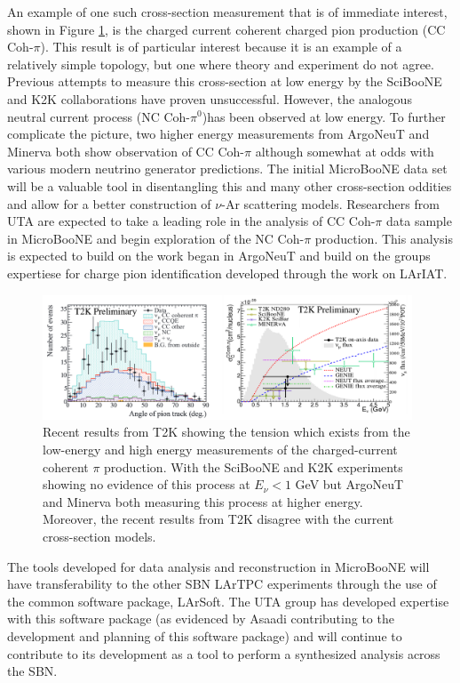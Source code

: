 An example of one such cross-section measurement that is of immediate interest, shown in Figure \ref{fig:cccohpion}, is the charged current coherent charged pion production (CC Coh-$\pi$). This result is of particular interest because it is an example of a relatively simple topology, but one where theory and experiment do not agree. Previous attempts to measure this cross-section at low energy by the SciBooNE and K2K collaborations have proven unsuccessful. However, the analogous neutral current process (NC Coh-$\pi^{0}$)has been observed at low energy. To further complicate the picture, two higher energy measurements from ArgoNeuT and Minerva both show observation of CC Coh-$\pi$ although somewhat at odds with various modern neutrino generator predictions. The initial MicroBooNE data set will be a valuable tool in disentangling this and many other cross-section oddities and allow for a better construction of $\nu$-Ar scattering models. Researchers from UTA are expected to take a leading role in the analysis of CC Coh-$\pi$ data sample in MicroBooNE and begin exploration of the NC Coh-$\pi$ production. This analysis is expected to build on the work began in ArgoNeuT \cite{} and build on the groups expertiese for charge pion identification developed through the work on LArIAT.
 
\begin{figure}[htb]
\centering
\includegraphics[width=0.98\textwidth]{images/CCCohPion.png}
\caption[]{Recent results from T2K \cite{} showing the tension which exists from the low-energy and high energy measurements of the charged-current coherent $\pi$ production. With the SciBooNE and K2K experiments showing no evidence of this process at $E_{\nu} < 1$ GeV but ArgoNeuT and Minerva both measuring this process at higher energy. Moreover, the recent results from T2K disagree with the current cross-section models.}
\label{fig:cccohpion}
\end{figure}


The tools developed for data analysis and reconstruction in MicroBooNE will have transferability to the other SBN LArTPC experiments through the use of the common software package, LArSoft. The UTA group has developed expertise with this software package (as evidenced by Asaadi contributing to the development and planning of this software package) and will continue to contribute to its development as a tool to perform a synthesized analysis across the SBN.
